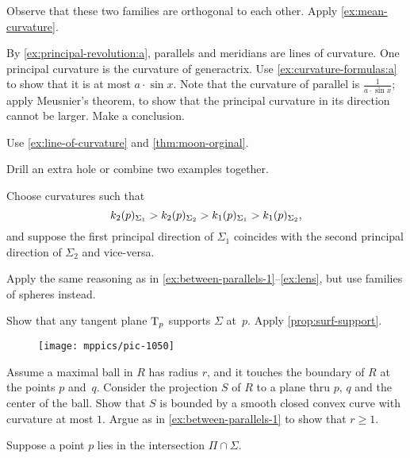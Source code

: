 \begin{multicols}{2}
Observe that these two families are orthogonal to each other.
Apply \ref{ex:mean-curvature}.

By \ref{ex:principal-revolution:a}, parallels and meridians are lines of curvature.
One principal curvature is the curvature of generactrix.
Use \ref{ex:curvature-formulas:a} to show that it is at most $a\cdot \sin x$.
Note that the curvature of parallel is $\tfrac1{a\cdot \sin x}$;
apply Meusnier's theorem, to show that the principal curvature in its direction cannot be larger.
Make a conclusion.

Use \ref{ex:line-of-curvature} and \ref{thm:moon-orginal}.

 Drill an extra hole or combine two examples together.



\setcounter{eqtn}{0}

Choose curvatures such that 
\[k_2(p)_{\Sigma_1}\z>k_2(p)_{\Sigma_2}> k_1(p)_{\Sigma_1}> k_1(p)_{\Sigma_2},\]
and suppose the first principal direction of $\Sigma_1$ coincides with the second principal direction of $\Sigma_2$ and vice-versa.

Apply the same reasoning as in \ref{ex:between-parallels-1}--\ref{ex:lens}, but use families of spheres instead.

Show that any tangent plane $\mathrm{T}_p$ supports $\Sigma$ at~$p$.
Apply \ref{prop:surf-support}.

\begin{wrapfigure}{r}{16 mm}
\vskip-5mm
\centering
\texttt{[image: mppics/pic-1050]}
\vskip-2mm
\end{wrapfigure}

Assume a maximal ball in $R$ has radius $r$, and it touches the boundary of $R$ at the points $p$ and~$q$.
Consider the projection $S$ of $R$ to a plane thru $p$, $q$ and the center of the ball.
Show that $S$ is bounded by a smooth closed convex curve with curvature at most $1$.
Argue as in \ref{ex:between-parallels-1} to
show that $r\ge 1$.

Suppose a point $p$ lies in the intersection $\Pi\cap\Sigma$.


\end{multicols}
